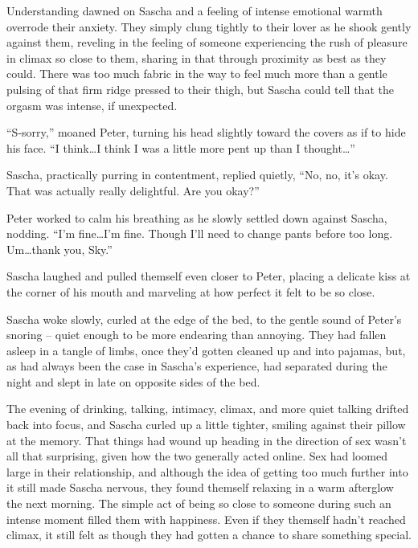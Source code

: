 Understanding dawned on Sascha and a feeling of intense emotional warmth overrode their anxiety. They simply clung tightly to their lover as he shook gently against them, reveling in the feeling of someone experiencing the rush of pleasure in climax so close to them, sharing in that through proximity as best as they could. There was too much fabric in the way to feel much more than a gentle pulsing of that firm ridge pressed to their thigh, but Sascha could tell that the orgasm was intense, if unexpected.

``S-sorry,'' moaned Peter, turning his head slightly toward the covers as if to hide his face. ``I think\ldots{}I think I was a little more pent up than I thought\ldots{}''

Sascha, practically purring in contentment, replied quietly, ``No, no, it's okay. That was actually really delightful. Are you okay?''

Peter worked to calm his breathing as he slowly settled down against Sascha, nodding. ``I'm fine\ldots{}I'm fine. Though I'll need to change pants before too long. Um\ldots{}thank you, Sky.''

Sascha laughed and pulled themself even closer to Peter, placing a delicate kiss at the corner of his mouth and marveling at how perfect it felt to be so close.

\secdiv

Sascha woke slowly, curled at the edge of the bed, to the gentle sound of Peter's snoring -- quiet enough to be more endearing than annoying. They had fallen asleep in a tangle of limbs, once they'd gotten cleaned up and into pajamas, but, as had always been the case in Sascha's experience, had separated during the night and slept in late on opposite sides of the bed.

The evening of drinking, talking, intimacy, climax, and more quiet talking drifted back into focus, and Sascha curled up a little tighter, smiling against their pillow at the memory. That things had wound up heading in the direction of sex wasn't all that surprising, given how the two generally acted online. Sex had loomed large in their relationship, and although the idea of getting too much further into it still made Sascha nervous, they found themself relaxing in a warm afterglow the next morning. The simple act of being so close to someone during such an intense moment filled them with happiness. Even if they themself hadn't reached climax, it still felt as though they had gotten a chance to share something special.


